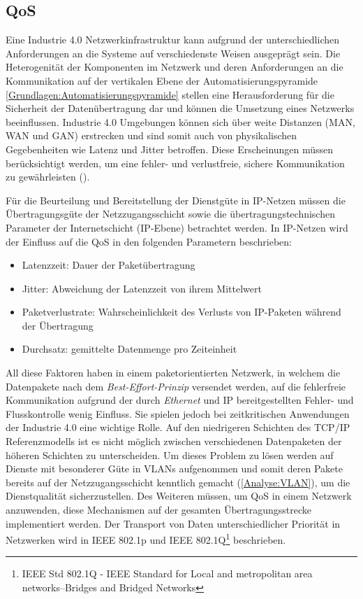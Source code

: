 \subsection{\ac{QoS}}
Eine Industrie 4.0 Netzwerkinfrastruktur kann aufgrund der unterschiedlichen Anforderungen an die Systeme auf verschiedenste Weisen ausgeprägt sein. Die Heterogenität der Komponenten im Netzwerk und deren Anforderungen an die Kommunikation auf der vertikalen Ebene der Automatisierungspyramide \autoref{Grundlagen:Automatisierungspyramide} stellen eine Herausforderung für die Sicherheit der Datenübertragung dar und können die Umsetzung eines Netzwerks beeinflussen. Industrie 4.0 Umgebungen können sich über weite Distanzen (\ac{MAN}, \ac{WAN} und \ac{GAN}) erstrecken und sind somit auch von physikalischen Gegebenheiten wie Latenz und Jitter betroffen. Diese Erscheinungen müssen berücksichtigt werden, um eine fehler- und verlustfreie, sichere Kommunikation zu gewährleisten (\cite{torscht2014}).

Für die Beurteilung und Bereitstellung der Dienstgüte in \ac{IP}-Netzen müssen die Übertragungsgüte der Netzzugangsschicht sowie die übertragungstechnischen Parameter der Internetschicht (\ac{IP}-Ebene) betrachtet werden. In IP-Netzen wird der Einfluss auf die \ac{QoS} in den folgenden Parametern beschrieben:

\begin{itemize}
    \item Latenzzeit: Dauer der Paketübertragung
    \item Jitter: Abweichung der Latenzzeit von ihrem Mittelwert
    \item Paketverlustrate: Wahrscheinlichkeit des Verlusts von IP-Paketen während der Übertragung
    \item Durchsatz: gemittelte Datenmenge pro Zeiteinheit
\end{itemize}

All diese Faktoren haben in einem paketorientierten Netzwerk, in welchem die Datenpakete nach dem \textit{Best-Effort-Prinzip} versendet werden, auf die fehlerfreie Kommunikation aufgrund der durch \textit{Ethernet} und \ac{IP} bereitgestellten Fehler- und Flusskontrolle wenig Einfluss. Sie spielen jedoch bei zeitkritischen Anwendungen der Industrie 4.0 eine wichtige Rolle. Auf den niedrigeren Schichten des \ac{TCP}/\ac{IP} Referenzmodells ist es nicht möglich zwischen verschiedenen Datenpaketen der höheren Schichten zu unterscheiden. Um dieses Problem zu lösen werden auf Dienste mit besonderer Güte in \ac{VLAN}s aufgenommen und somit deren Pakete bereits auf der Netzzugangsschicht kenntlich gemacht (\autoref{Analyse:VLAN}), um die Dienstqualität sicherzustellen. Des Weiteren müssen, um \ac{QoS} in einem Netzwerk anzuwenden, diese Mechanismen auf der gesamten Übertragungsstrecke implementiert werden. Der Transport von Daten unterschiedlicher Priorität in Netzwerken wird in \ac{IEEE} 802.1p und \ac{IEEE} 802.1Q\footnote{IEEE Std 802.1Q - IEEE Standard for Local and metropolitan area networks--Bridges and Bridged Networks} beschrieben.

